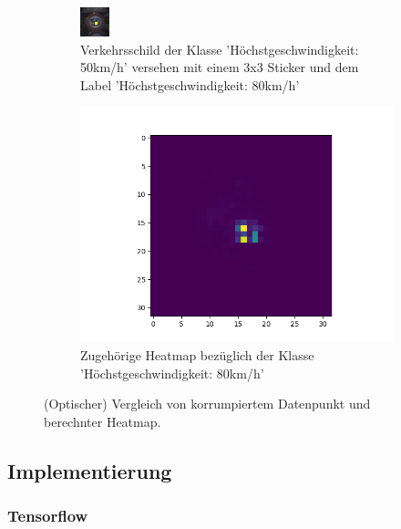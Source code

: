 \documentclass[twoside, 11pt,a4paper]{article}
\numberwithin{equation}{section}
\begin{document}
	\begin{figure}
		\centering
		\begin{subfigure}{.5\textwidth}
			\centering
			\includegraphics[width=.4\linewidth]{1450_poison}
			\caption{Verkehrsschild der Klasse 'Höchstgeschwindigkeit: 50km/h' versehen mit einem 3x3 Sticker und dem Label 'Höchstgeschwindigkeit: 80km/h'}
			
		\end{subfigure}%
		\begin{subfigure}{.5\textwidth}
			\centering
			\includegraphics[width=.7\linewidth]{1450_poison_lrp.png}
			\caption{Zugehörige Heatmap bezüglich der Klasse 'Höchstgeschwindigkeit: 80km/h'}
			
		\end{subfigure}
		\caption{(Optischer) Vergleich von korrumpiertem Datenpunkt und berechnter Heatmap.}
		\label{vergleich_original_lrp}
	\end{figure}
	\subsection{Implementierung}
	
	\subsubsection{Tensorflow}
\end{document}
